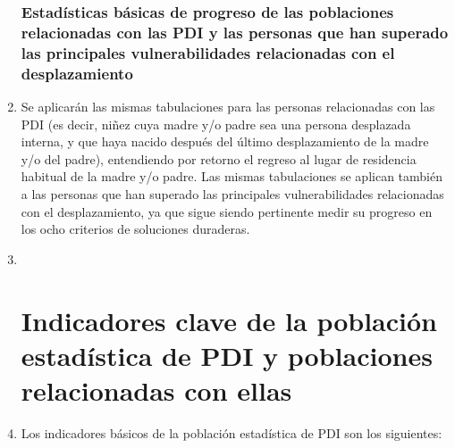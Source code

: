 \documentclass[
]{book}
\begin{document}
\begin{enumerate}
{  \subsubsection{Estadísticas básicas de progreso de las poblaciones relacionadas con las PDI y las personas que han superado las principales vulnerabilidades relacionadas con el desplazamiento}\label{estaduxedsticas-buxe1sicas-de-progreso-de-las-poblaciones-relacionadas-con-las-pdi-y-las-personas-que-han-superado-las-principales-vulnerabilidades-relacionadas-con-el-desplazamiento}}
\item
  Se aplicarán las mismas tabulaciones para las personas relacionadas con las PDI (es decir, niñez cuya madre y/o padre sea una persona desplazada interna, y que haya nacido después del último desplazamiento de la madre y/o del padre), entendiendo por retorno el regreso al lugar de residencia habitual de la madre y/o padre. Las mismas tabulaciones se aplican también a las personas que han superado las principales vulnerabilidades relacionadas con el desplazamiento, ya que sigue siendo pertinente medir su progreso en los ocho criterios de soluciones duraderas.
\item ~
  \hypertarget{indicadores-clave-de-la-poblaciuxf3n-estaduxedstica-de-pdi-y-poblaciones-relacionadas-con-ellas}{%
  \section{Indicadores clave de la población estadística de PDI y poblaciones relacionadas con ellas}\label{indicadores-clave-de-la-poblaciuxf3n-estaduxedstica-de-pdi-y-poblaciones-relacionadas-con-ellas}}
\item
  Los indicadores básicos de la población estadística de PDI son los siguientes:


\end{enumerate}
\end{document}
